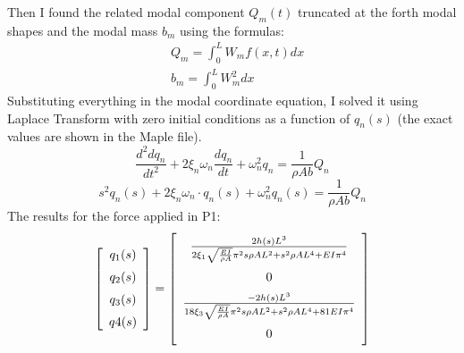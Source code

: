 \documentclass[11pt,a4paper]{article}
\begin{document}
\begin{enumerate}
	Then I found the related modal component $Q_m(t)$ truncated at the forth modal shapes and the modal mass $b_m$ using the formulas:
	\begin{align*}
	&Q_{m}=\int_{0}^{L} W_{m} f(x,t) dx\\
	&b_{m}= \int_{0}^{L}  W_{m}^2 dx
	\end{align*}
	Substituting everything in the modal coordinate equation, I solved it using Laplace Transform with zero initial conditions as a function of $q_n(s)$ (the exact values are shown in the Maple file).
	\begin{equation}
	\frac{d^2 dq_n}{dt^2} + 2\xi_n\omega_n\frac{dq_n}{dt} + \omega_n^2q_n = \frac{1}{\rho Ab}Q_n
	\end{equation}
	\begin{equation}
	s^2q_n(s)+2\xi_n\omega_n\cdot q_n(s)+\omega_n^2q_n(s) = \frac{1}{\rho Ab}Q_n
	\end{equation}
	The results for the force applied in P1:
	\begin{equation*}
	\left[ \begin {array}{c} {q_1}(s) 
	\\ \noalign{\medskip}{q_2}(s) \\ \noalign{\medskip}{q_3}(s) \\ \noalign{\medskip}{q4}(s)\end {array} \right] = \left[ \begin {array}{c} \frac{2h(s){L}^{3}} {2\xi_{{1}}\sqrt {{\frac {EI}{\rho A}}}{\pi}^{2}s\rho A{L}^{2}+{s}^{2}\rho A{L}^{4}+EI{\pi}^{4}}
	\\ \noalign{\medskip}0\\ \noalign{\medskip}\frac{-2h(s){L}^{3}}{ 18\xi_{{3}}\sqrt {{\frac {EI}{\rho A}}}{\pi}^{2}s\rho A{L}^{2}+{s}^{2}\rho A{L}^{4}+81EI{\pi}^{4}}
	\\ \noalign{\medskip}0\end {array} \right] 		
	\end{equation*}
	

\end{enumerate}
\end{document}
